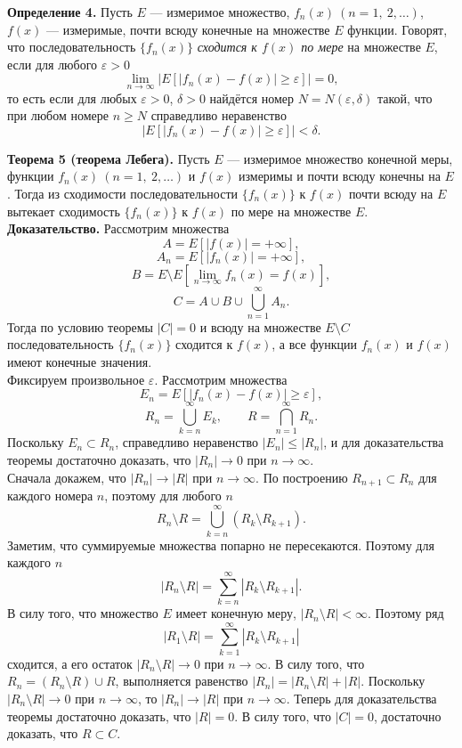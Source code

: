 \documentclass[12pt,a4paper, titlepage]{article}
\begin{document}
\textbf{Определение 4.} Пусть $E$ --- измеримое множество, $f_n(x) \ (n = 1,\ 2,\dots)$, $f(x)$ --- измеримые, почти всюду конечные на множестве $E$ функции. Говорят, что последовательность $\lbrace f_n(x) \rbrace$ \textit{сходится к $f(x)$ по мере} на множестве $E$, если для любого $\varepsilon > 0$
$$
\lim_{n\to\infty} |E[|f_n(x)-f(x)| \geqslant \varepsilon]| = 0,
$$
то есть если для любых $\varepsilon > 0$, $\delta > 0$ найдётся номер $N = N(\varepsilon, \delta)$ такой, что при любом номере $n \geqslant N$ справедливо неравенство
$$
|E[|f_n(x)-f(x)| \geqslant \varepsilon]| < \delta.
$$

\textbf{Теорема 5 (теорема Лебега).} Пусть $E$ --- измеримое множество конечной меры, функции $f_n(x) \ (n = 1,\ 2,\dots)$ и $f(x)$ измеримы и почти всюду конечны на $E$. Тогда из сходимости последовательности $\lbrace f_n(x) \rbrace$ к $f(x)$ почти всюду на $E$ вытекает сходимость $\lbrace f_n(x) \rbrace$ к $f(x)$ по мере на множестве $E$.\\
\textbf{Доказательство.}
Рассмотрим множества
$$
A = E[|f(x)| = +\infty],
$$
$$
A_n = E[|f_n(x)|=+\infty],
$$
$$
B=E\setminus E[\lim_{n\to\infty} f_n(x) = f(x)],
$$
$$
C = A \cup B \cup {\bigcup_{n=1}^\infty A_n}.
$$
Тогда по условию теоремы $|C| = 0$ и всюду на множестве $E \setminus C$ последовательность $\lbrace f_n(x) \rbrace$ сходится к $f(x)$, а все функции $f_n(x)$ и $f(x)$ имеют конечные значения.\\

Фиксируем произвольное $\varepsilon$. Рассмотрим множества
$$
E_n = E[|f_n(x) - f(x)| \geqslant \varepsilon],
$$
$$
R_n = \bigcup_{k=n}^\infty E_k, \qquad R = \bigcap_{n=1}^\infty R_n.
$$
Поскольку $E_n \subset R_n$, справедливо неравенство $|E_n| \leqslant |R_n|$, и для доказательства теоремы достаточно доказать, что $|R_n| \to 0$ при $n \to \infty$.\\

Сначала докажем, что $|R_n| \to |R|$ при $n \to \infty$. По построению $R_{n+1} \subset R_n$ для каждого номера $n$, поэтому для любого $n$
$$
R_n \setminus R = \bigcup_{k=n}^\infty (R_k \setminus R_{k+1}).
$$
Заметим, что суммируемые множества попарно не пересекаются. Поэтому для каждого $n$
$$
|R_n \setminus R| = \sum_{k=n}^\infty  |R_k \setminus R_{k+1}|.
$$
В силу того, что множество $E$ имеет конечную меру, $|R_n \setminus R| < \infty$. Поэтому ряд
$$
|R_1 \setminus R| = \sum_{k=1}^\infty  |R_k \setminus R_{k+1}|
$$
сходится, а его остаток $|R_n \setminus R| \to 0$ при $n \to \infty$. В силу того, что $R_n = (R_n \setminus R) \cup R$, выполняется равенство $|R_n| = |R_n \setminus R| + |R|$. Поскольку $|R_n \setminus R| \to 0$ при $n \to \infty$, то $|R_n| \to |R|$ при $n \to \infty$. Теперь для доказательства теоремы достаточно доказать, что $|R| = 0$. В силу того, что $|C| = 0$, достаточно доказать, что $R \subset C$.\\
\end{document}

